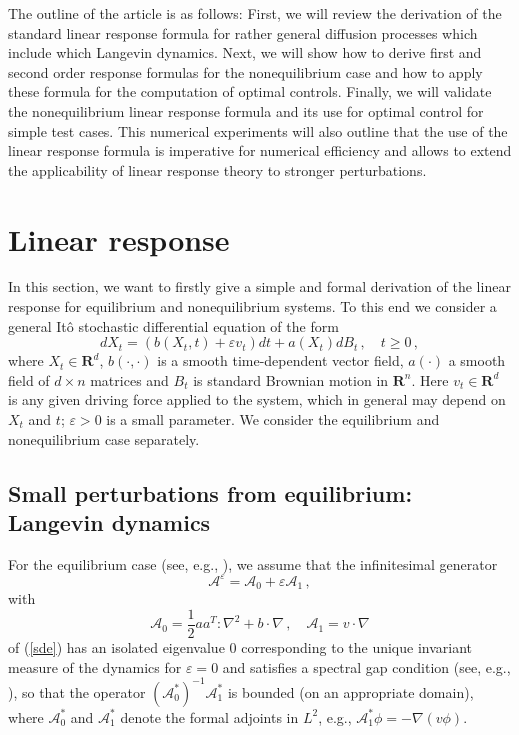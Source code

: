 \documentclass[aip,jcp,a4paper,reprint,onecolumn]{revtex4-1}
\newcommand{\R}{{\mathbf R}}
\newcommand{\eps}{\varepsilon}
\newcommand{\fwg}{{\mathcal A}}
\newcommand{\cA}{\mathcal A}
\begin{document}
The outline of the article is as follows: First, we will review the derivation of the standard linear response formula for  rather general diffusion processes which include which Langevin dynamics. Next, we will show how to derive first and second order response formulas for the nonequilibrium case and how to apply these formula for the computation of optimal controls. Finally, we will validate the nonequilibrium linear response formula and its use for optimal control for simple test cases. This numerical experiments will also outline that the use of the linear response formula is imperative for numerical efficiency and allows to extend the applicability of linear response theory to stronger perturbations. 


 


\section{Linear response}


In this section, we want to firstly give a simple and formal derivation of the linear response for equilibrium and nonequilibrium systems. To this end we consider a general It\^o stochastic differential equation of the form
\begin{equation}\label{sde}
dX_{t} = (b(X_{t},t) + \eps v_{t})dt +a(X_{t})dB_{t}\,,\quad t\ge 0\,,
\end{equation}
where $X_{t}\in\R^{d}$, $b(\cdot,\cdot)$ is a smooth time-dependent vector field, $a(\cdot)$ a smooth field of $d\times n$ matrices and $B_{t}$ is standard Brownian motion in $\R^{n}$. Here $v_{t}\in\R^{d}$ is any given driving force applied to the system, which in general may depend on $X_{t}$ and $t$; $\eps>0$ is a small parameter. We consider the equilibrium and nonequilibrium case separately. 


  




\subsection{Small perturbations from equilibrium: Langevin dynamics}

For the equilibrium case (see, e.g., \cite{XXX,YYY,ZZZ}), we assume that the infinitesimal generator
\[
\fwg^{\eps} = \fwg_{0} + \eps\fwg_{1}\,, 
\]
with 
\[
\fwg_{0} = \frac{1}{2}aa^{T}\colon\nabla^{2} + b\cdot\nabla\,,\quad \fwg_{1}=v\cdot\nabla 
\]
of (\ref{sde}) has an isolated eigenvalue 0 corresponding to the unique invariant measure of the dynamics for $\eps=0$ and satisfies a spectral gap condition (see, e.g., \cite{stoltz2012}), so that the operator $(\fwg_{0}^{*})^{-1}\fwg_{1}^{*}$ is bounded (on an appropriate domain), where $\cA_{0}^{*}$ and $\cA_{1}^{*}$ denote the formal adjoints in $L^{2}$, e.g., $\cA_{1}^{*}\phi=-\nabla(v \phi)$.  
\end{document}
